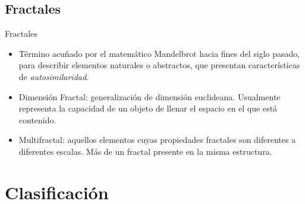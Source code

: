 \documentclass{beamer}
\begin{document}
\subsection{Fractales}
\begin{frame}
{\huge Fractales }
\begin{itemize}
\item T\'ermino acu\~nado por el matem\'atico Mandelbrot hacia fines del siglo pasado, para describir elementos naturales o abstractos, que presentan caracter\'isticas de {\em autosimilaridad}.
\item Dimensi\'on Fractal: generalizaci\'on de dimensi\'on euclideana. Usualmente representa la capacidad de un objeto de llenar el espacio en el que est\'a contenido.
\item Multifractal: aquellos elementos cuyas propiedades fractales son diferentes a diferentes escalas. M\'as de un fractal presente en la misma estructura.
\end{itemize}
\end{frame}


\section{Clasificaci\'on}
\end{document}
